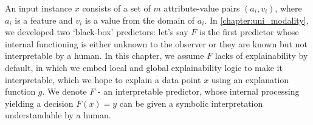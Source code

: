 \hspace*{3.5mm} An input instance $x$ consists of a set of $m$ attribute-value pairs $\left(a_{i}, v_{i}\right)$, where $a_i$ is a feature and $v_i$ is a value from the domain of $a_i$. In \cref{chapter:uni_modality}, we developed two `black-box' predictors: let's say $F$ is the first predictor whose internal functioning is either unknown to the observer or they are known but not interpretable by a human. In this chapter, we assume $F$ lacks of explainability by default, in which we embed local and global explainability logic to make it interpretable, which we hope to explain a data point $x$ using an explanation function $g$. We denote ${F}$ - an interpretable predictor, whose internal processing yielding a decision ${F}(x)=y$ can be given a symbolic interpretation understandable by a human. 

